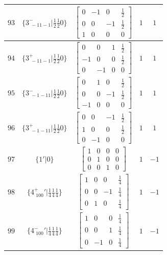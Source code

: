 \documentclass[fleqn,8pt]{jsarticle}
\begin{document}
\begin{longtable}{ccccc}
$ 93 $ & $ \{3^{-}_{\,\,-11-1}|\frac{1}{2} \frac{1}{2} 0\} $ & $ \begin{bmatrix} 0 & -1 & 0 & \frac{1}{2} \\ 0 & 0 & -1 & \frac{1}{2} \\ 1 & 0 & 0 & 0 \end{bmatrix} $ & $ 1 $ & $ 1 $ \\ \hline
$ 94 $ & $ \{3^{+}_{\,\,-11-1}|\frac{1}{2} \frac{1}{2} 0\} $ & $ \begin{bmatrix} 0 & 0 & 1 & \frac{1}{2} \\ -1 & 0 & 0 & \frac{1}{2} \\ 0 & -1 & 0 & 0 \end{bmatrix} $ & $ 1 $ & $ 1 $ \\ \hline
$ 95 $ & $ \{3^{-}_{\,\,-1-11}|\frac{1}{2} \frac{1}{2} 0\} $ & $ \begin{bmatrix} 0 & 1 & 0 & \frac{1}{2} \\ 0 & 0 & -1 & \frac{1}{2} \\ -1 & 0 & 0 & 0 \end{bmatrix} $ & $ 1 $ & $ 1 $ \\ \hline
$ 96 $ & $ \{3^{+}_{\,\,-1-11}|\frac{1}{2} \frac{1}{2} 0\} $ & $ \begin{bmatrix} 0 & 0 & -1 & \frac{1}{2} \\ 1 & 0 & 0 & \frac{1}{2} \\ 0 & -1 & 0 & 0 \end{bmatrix} $ & $ 1 $ & $ 1 $ \\ \hline
$ 97 $ & $ \{1{}'|0\} $ & $ \begin{bmatrix} 1 & 0 & 0 & 0 \\ 0 & 1 & 0 & 0 \\ 0 & 0 & 1 & 0 \end{bmatrix} $ & $ 1 $ & $ -1 $ \\ \hline
$ 98 $ & $ \{4^{+}_{\,\,100}{}'|\frac{1}{4} \frac{1}{4} \frac{1}{4}\} $ & $ \begin{bmatrix} 1 & 0 & 0 & \frac{1}{4} \\ 0 & 0 & -1 & \frac{1}{4} \\ 0 & 1 & 0 & \frac{1}{4} \end{bmatrix} $ & $ 1 $ & $ -1 $ \\ \hline
$ 99 $ & $ \{4^{-}_{\,\,100}{}'|\frac{1}{4} \frac{1}{4} \frac{1}{4}\} $ & $ \begin{bmatrix} 1 & 0 & 0 & \frac{1}{4} \\ 0 & 0 & 1 & \frac{1}{4} \\ 0 & -1 & 0 & \frac{1}{4} \end{bmatrix} $ & $ 1 $ & $ -1 $ \\ \hline

\end{longtable}
\end{document}
